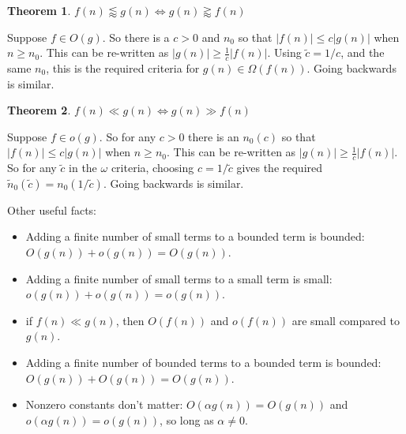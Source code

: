 \documentclass{tufte-handout}
\theoremstyle{definition}
\theoremstyle{example}
\theoremstyle{theorem}
\newtheorem{theorem}{Theorem}
\begin{document}
\begin{theorem}{$f(n) \lessapprox g(n) \iff g(n) \gtrapprox f(n)$}  

Suppose $f \in O(g)$.  So there is a $c > 0$ and $n_0$ so that $|f(n)| \leq c |g(n)|$ when $n \geq n_0$.  This can be re-written as $|g(n)| \geq \frac{1}{c} |f(n)|$.  Using $\tilde{c}=1/c$, and the same $n_0$, this is the required criteria for $g(n) \in \Omega(f(n))$. Going backwards is similar.
\end{theorem}

\begin{theorem}{$f(n) \ll g(n) \iff g(n) \gg f(n)$}  

Suppose $f \in o(g)$.  So for any $c > 0$ there is an $n_0(c)$ so that $|f(n)| \leq c |g(n)|$ when $n \geq n_0$.  This can be re-written as $|g(n)| \geq \frac{1}{c} |f(n)|$.  So for any $\tilde{c}$ in the $\omega$ criteria, choosing $c=1/\tilde{c}$ gives the required $\tilde{n}_0(\tilde{c})=n_0(1/\tilde{c})$. Going backwards is similar.
\end{theorem}

Other useful facts:
\begin{itemize}
    \item Adding a finite number of small terms to a bounded term is bounded: $O(g(n)) + o(g(n)) = O(g(n))$.
    \item Adding a finite number of small terms to a small term is small: $o(g(n)) + o(g(n)) = o(g(n))$.
    \item if $f(n) \ll g(n)$, then $O(f(n))$ and $o(f(n))$ are small compared to $g(n)$.
    \item Adding a finite number of bounded terms to a bounded term is bounded: $O(g(n)) + O(g(n)) = O(g(n))$.
    \item Nonzero constants don't matter: $O(\alpha g(n))=O(g(n))$ and $o(\alpha g(n))=o(g(n))$, so long as $\alpha \neq 0$.
\end{itemize}
\end{document}
